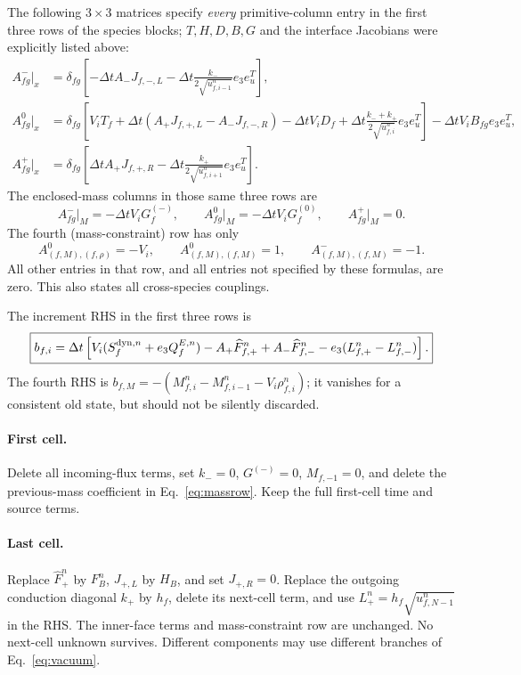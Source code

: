 \documentclass[11pt]{article}
\begin{document}
The following $3\times3$ matrices specify \emph{every} primitive-column
entry in the first three rows of the species blocks; $T,H,D,B,G$ and
the interface Jacobians were explicitly listed above:
\begin{align}
 A^-_{fg}\big|_{x}
 &=\delta_{fg}\left[-\Delta t A_-J_{f,-,L}
 -\Delta t\frac{k_-}{2\sqrt{u_{f,i-1}^n}}e_3e_u^T\right],
 \label{eq:blockminus}\\
 A^0_{fg}\big|_{x}
 &=\delta_{fg}\left[V_iT_f+\Delta t(A_+J_{f,+,L}-A_-J_{f,-,R})
 -\Delta t V_iD_f
 +\Delta t\frac{k_-+k_+}{2\sqrt{u_{f,i}^n}}e_3e_u^T\right]
 -\Delta t V_i B_{fg}e_3e_u^T,\\
 A^+_{fg}\big|_{x}
 &=\delta_{fg}\left[\Delta t A_+J_{f,+,R}
 -\Delta t\frac{k_+}{2\sqrt{u_{f,i+1}^n}}e_3e_u^T\right].
 \label{eq:blockplus}
\end{align}
The enclosed-mass columns in those same three rows are
\begin{equation}
 A^-_{fg}\big|_M=-\Delta t V_iG_f^{(-)},\qquad
 A^0_{fg}\big|_M=-\Delta t V_iG_f^{(0)},\qquad
 A^+_{fg}\big|_M=0.
\end{equation}
The fourth (mass-constraint) row has only
\begin{equation}
 A^0_{(f,M),(f,\rho)}=-V_i,\qquad
 A^0_{(f,M),(f,M)}=1,\qquad
 A^-_{(f,M),(f,M)}=-1.
 \label{eq:massrow}
\end{equation}
All other entries in that row, and all entries not specified by these
formulas, are zero. This also states all cross-species couplings.

The increment RHS in the first three rows is
\begin{equation}
 \boxed{b_{f,i}=\Delta t\left[V_i(S_f^{{\rm dyn},n}+e_3Q_f^{E,n})
 -A_+\widehat F_{f,+}^n+A_-\widehat F_{f,-}^n
 -e_3(L_{f,+}^n-L_{f,-}^n)\right].}
 \label{eq:rhs}
\end{equation}
The fourth RHS is
$b_{f,M}=-(M_{f,i}^n-M_{f,i-1}^n-V_i\rho_{f,i}^n)$; it vanishes
for a consistent old state, but should not be silently discarded.

\paragraph{First cell.}
Delete all incoming-flux terms, set $k_-=0$, $G^{(-)}=0$,
$M_{f,-1}=0$, and delete the previous-mass coefficient in
Eq.~\eqref{eq:massrow}. Keep the full first-cell time and source terms.

\paragraph{Last cell.}
Replace $\widehat F_+^n$ by $F_B^n$, $J_{+,L}$ by $H_B$,
and set $J_{+,R}=0$. Replace the outgoing conduction diagonal $k_+$
by $h_f$, delete its next-cell term, and use
$L_+^n=h_f\sqrt{u_{f,N-1}^n}$ in the RHS. The inner-face terms and
mass-constraint row are unchanged. No next-cell unknown survives.
Different components may use different branches of Eq.~\eqref{eq:vacuum}.
\end{document}
